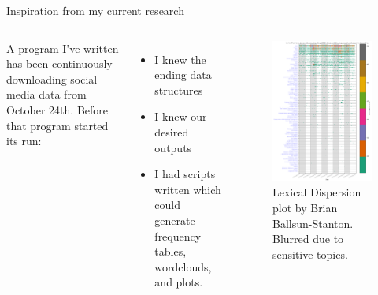 \documentclass[aspectratio=1610, 11pt]{beamer} %
\begin{document}
\begin{frame}{Inspiration from my current research}
\begin{columns}
A program I've written has been continuously downloading social media data from October 24th. Before that program started its run:

\begin{itemize}[label=\textbullet]
\item I knew the ending data structures
\item I knew our desired outputs
\item I had scripts written which could generate frequency tables, wordclouds, and plots.
\end{itemize}

\begin{figure}
    \includegraphics[height=.7\textheight]{figures/blur.png}
    \caption{Lexical Dispersion plot by Brian Ballsun-Stanton. Blurred due to sensitive topics.}
    \label{fig:blur}
\end{figure}


\end{columns}
\end{frame}
\end{document}
